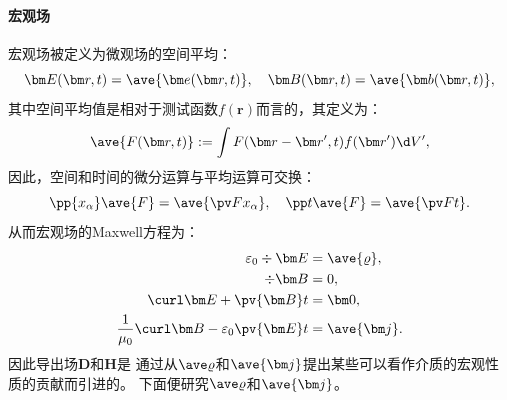 \paragraph{宏观场}
宏观场被定义为微观场的空间平均：
\[
    \bm E(\bm r,t)=\ave{\bm e(\bm r,t)},\quad \bm B(\bm r,t)=\ave{\bm b(\bm r,t)},
\]
其中空间平均值是相对于测试函数$f(\bm r)$而言的，其定义为：
\[
    \ave{F(\bm r,t)}:=\int F(\bm r-\bm r',t)f(\bm r')\d V',
\]
因此，空间和时间的微分运算与平均运算可交换：
\[
    \pp{x_\alpha}\ave{F}=\ave{\pv F{x_\alpha}},\quad\pp t\ave{F}=\ave{\pv Ft}.
\]
从而宏观场的Maxwell方程为： 
\begin{align}
    \label{eqn:average rho}
    \varepsilon_0\div\bm E&=\ave{\varrho},\\
    \notag
    \div\bm B&=0,\\
    \notag
    \curl\bm E+\pv{\bm B}t&=\bm0,\\
    \label{eqn:average j}
    \frac1{\mu_0}\curl\bm B-\varepsilon_0\pv{\bm E}t&=\ave{\bm j}.
\end{align}
因此导出场$\bm D$和$\bm H$是
通过从$\ave\varrho$和$\ave{\bm j}$提出某些可以看作介质的宏观性质的贡献而引进的。
下面便研究$\ave\varrho$和$\ave{\bm j}$。
